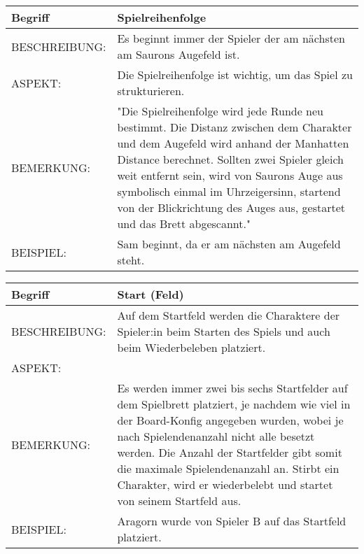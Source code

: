 \documentclass{uulm-assignment}
\begin{document}
	     \begin{tabularx}{\textwidth}{|l|X |} \hline
	        \textbf{Begriff} & \textbf{Spielreihenfolge} \\
	        \hline
	        BESCHREIBUNG: & Es beginnt immer der Spieler der am nächsten am Saurons Augefeld ist. \\
	        \hline
	        ASPEKT: &  Die Spielreihenfolge ist wichtig, um das Spiel zu strukturieren.
	        \\
	        \hline
	        BEMERKUNG: & "Die Spielreihenfolge wird jede Runde neu bestimmt. Die Distanz zwischen dem Charakter und dem Augefeld wird anhand der Manhatten Distance berechnet.
	        Sollten zwei Spieler gleich weit entfernt sein, wird von Saurons Auge aus symbolisch einmal im Uhrzeigersinn, startend von der Blickrichtung des Auges aus, gestartet und das Brett abgescannt." \\
	        \hline
	        BEISPIEL: & Sam beginnt, da er am nächsten am Augefeld steht.\\
	        \hline
	    \end{tabularx}

	      \begin{tabularx}{\textwidth}{|l|X |} \hline
	        \textbf{Begriff} & \textbf{Start (Feld)} \\
	        \hline
	        BESCHREIBUNG: &  Auf dem Startfeld werden die Charaktere der Spieler:in beim Starten des Spiels und auch beim Wiederbeleben platziert. \\
	        \hline
	        ASPEKT: & 
	        \\
	        \hline
	        BEMERKUNG: &  Es werden immer zwei bis sechs Startfelder auf dem Spielbrett platziert, je nachdem wie viel in der Board-Konfig angegeben wurden, wobei je nach Spielendenanzahl nicht alle besetzt werden. Die Anzahl der Startfelder gibt somit die maximale Spielendenanzahl an. Stirbt ein Charakter, wird er wiederbelebt und startet von seinem Startfeld aus.\\
	        \hline
	        BEISPIEL: & Aragorn wurde von Spieler B auf das Startfeld platziert.\\
	        \hline
	    \end{tabularx}
\end{document}
